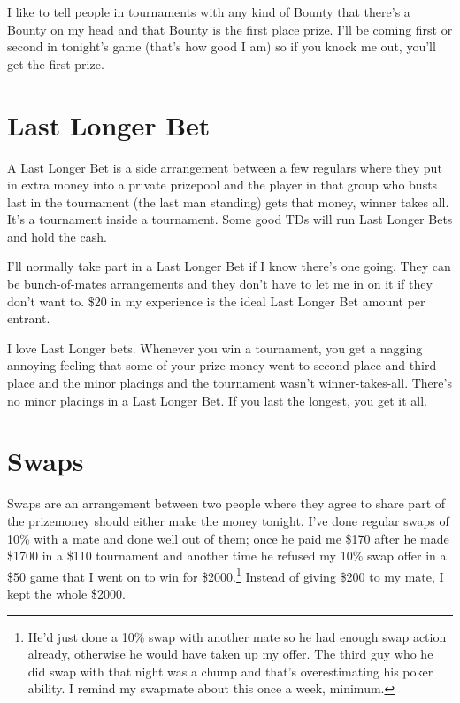 I like to tell people in tournaments with any kind of Bounty
that there's a Bounty on my head and that Bounty is the first
place prize. I'll be coming first or second in tonight's game (that's
how good I am) so if you knock me out, you'll get the first prize.

\section{Last Longer Bet}

A Last Longer Bet is a side arrangement between a few regulars
where they put in extra money into a private prizepool and the player
in that group who busts last in the tournament (the last man standing)
gets that money, winner takes all. It's a tournament inside a tournament.
Some good TDs will run Last Longer Bets and hold the cash.

I'll normally take part in a Last Longer Bet if I know there's one
going. They can be bunch-of-mates arrangements and
they don't have to let me in on it if they don't want to. \$20 in my
experience is the ideal Last Longer Bet amount per entrant.

I love Last Longer bets. Whenever you win a tournament, you get a
nagging annoying feeling that some of your prize money went to second
place and third place and the minor placings and the tournament wasn't
winner-takes-all. There's no minor placings in a Last Longer Bet. If
you last the longest, you get it all.

\newpage

\section{Swaps}


Swaps are an arrangement between two people where they
agree to share part of the prizemoney should
either make the money tonight. I've done regular swaps of 10\% with a mate and
done well out of them; once he paid me
\$170 after he made \$1700 in a \$110 tournament and another time
he refused my 10\% swap offer in a \$50 game that I
went on to win for \$2000.\footnote{He'd
just done a 10\% swap with another mate so he had enough swap action
already, otherwise he would have taken up my offer. The third
guy who he did swap with that night was a chump and that's
overestimating his poker ability. I remind my swapmate about this once
a week, minimum.} Instead of giving \$200 to my mate, I kept the whole
\$2000.

